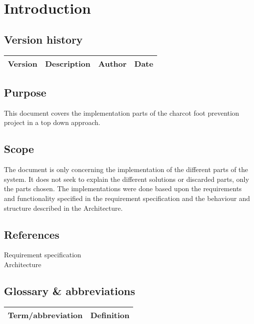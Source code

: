 \chapter{Introduction}
\section{Version history}
\begin{table}[H]
\begin{tabular}{|c|p{9cm}|c|c|}
\hline
Version & Description & Author & Date\\
\hline
\end{tabular}
\end{table}

\section{Purpose}
This document covers the implementation parts of the charcot foot prevention project in a top down approach.

\section{Scope}
The document is only concerning the implementation of the different parts of the system. It does not seek to explain the different solutions or discarded parts, only the parts chosen. The implementations were done based upon the requirements and functionality specified in the requirement specification and the behaviour and structure described in the Architecture.

\section{References}
Requirement specification \\
Architecture \\

\section{Glossary \& abbreviations}
\begin{table}[H]
\centering
\begin{tabular}{|p{4cm}|p{7cm}|}
\hline
Term/abbreviation & Definition\\ \hline
\end{tabular}
\end{table}
